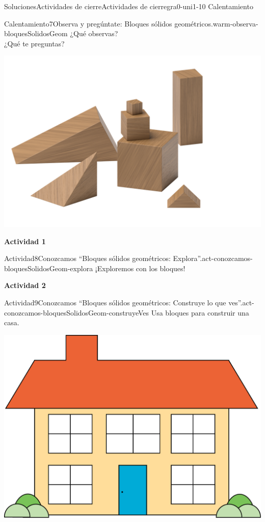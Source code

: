 \documentclass[twoside,10pt,]{article}
\begin{document}
\begin{solutions-section}{Soluciones}{Actividades de cierre}{}{Actividades de cierre}{}{}{gra0-uni1-10}
{\space\textperiodcentered\space{}Calentamiento}
\begin{explorationsolution}{Calentamiento}{7}{Observa y pregúntate: Bloques sólidos geométricos.}{warm-observa-bloquesSolidosGeom}%
¿Qué observas?\\
 ¿Qué te preguntas?%
\begin{image}{0.25}{0.5}{0.25}{}%
\includegraphics[width=\linewidth]{external/png-source/K.1.A Beta Student Workbook.Geoblocks.png}
\end{image}%
\end{explorationsolution}%
\par\medskip
\noindent\textbf{\large{}\space\textperiodcentered\space{}Actividad 1}
\begin{activitysolution}{Actividad}{8}{Conozcamos ``Bloques sólidos geométricos: Explora''.}{act-conozcamos-bloquesSolidosGeom-explora}%
¡Exploremos con los bloques!%
\end{activitysolution}%
\par\medskip
\noindent\textbf{\large{}\space\textperiodcentered\space{}Actividad 2}
\begin{activitysolution}{Actividad}{9}{Conozcamos “Bloques sólidos geométricos: Construye lo que ves”.}{act-conozcamos-bloquesSolidosGeom-construyeVes}%
Usa bloques para construir una casa.%
\begin{image}{0}{1}{0}{}%
\includegraphics[width=\linewidth]{external/png-source/house.png}

\end{image}
\end{activitysolution}
\end{solutions-section}
\end{document}
